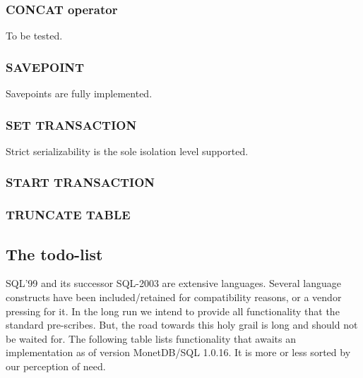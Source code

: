 \documentclass[10pt,twocolumn,fleqn]{article}
\begin{document}
\subsubsection*{CONCAT operator}
To be tested.

\subsubsection*{SAVEPOINT}
Savepoints are fully implemented.

\subsubsection*{SET TRANSACTION}
Strict serializability is the sole isolation level supported.

\subsubsection*{START TRANSACTION}
\subsubsection*{TRUNCATE TABLE}

\subsection{The todo-list}
SQL'99 and its successor SQL-2003 are extensive languages.
Several language constructs have been included/retained for
compatibility reasons, or a vendor pressing for it.
In the long run we intend to provide all functionality that
the standard pre-scribes. But, the road towards this holy grail
is long and should not be waited for.
The following table lists functionality that awaits an implementation
as of version MonetDB/SQL 1.0.16. It is more or less sorted by
our perception of need.
\end{document}
